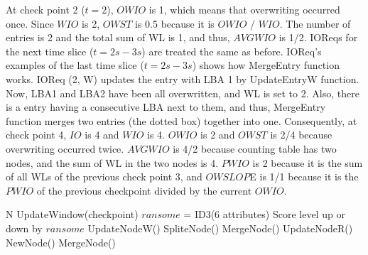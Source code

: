 \documentclass[conference]{IEEEtran}
\begin{document}
At check point 2 ($t=2$), $OWIO$ is 1, which means that overwriting occurred once. 
Since $WIO$ is 2, $OWST$ is 0.5 because it is $OWIO$ / $WIO$. 
The number of entries is 2 and the total sum of WL is 1, and thus, $AVGWIO$ is 1/2. 
IOReqs for the next time slice ($t=2s-3s$) are treated the same as before. 
IOReq's examples of the last time slice ($t=2s-3s$) shows how MergeEntry function works.
IOReq (2, W) updates the entry with LBA 1 by UpdateEntryW function. 
Now, LBA1 and LBA2 have been all overwritten, and WL is set to 2. 
Also, there is a entry having a consecutive LBA next to them, and thus,
MergeEntry function merges two entries (the dotted box) together into one.
Consequently, at check point 4, $IO$ is 4 and $WIO$ is 4. $OWIO$ is 2 and $OWST$ is 2/4 because overwriting occurred twice. $AVGWIO$ is 4/2 because counting table has two nodes,
and the sum of WL in the two nodes is 4. $PWIO$ is 2 because it is the sum of 
all WLs of the previous check point 3, and $OWSLOP$E is 1/1 because it is the $PWIO$ of 
the previous checkpoint divided by the current $OWIO$.
\begin{algorithm}[t]
        \caption{$\mathsf{Ransomware Detection}$} \label{alg:detect}
        \begin{algorithmic}[1]
        \REQUIRE N
                \STATE UpdateWindow(checkpoint)
                \STATE $ransome$ = ID3(6 attributes)
                \STATE Score level up or down by $ransome$
        \ENDIF
                \STATE UpdateNodeW()
                    \STATE SpliteNode()
                \ENDIF
                    \STATE MergeNode()
                \ENDIF
            \ENDIF
        \ELSE
                    \STATE UpdateNodeR()
                \ELSE
                    \STATE NewNode()
                \ENDIF
                    \STATE MergeNode()
                \ENDIF
            \ENDIF
        \ENDIF
        \ENDWHILE
        \end{algorithmic}
\end{algorithm}
\end{document}
